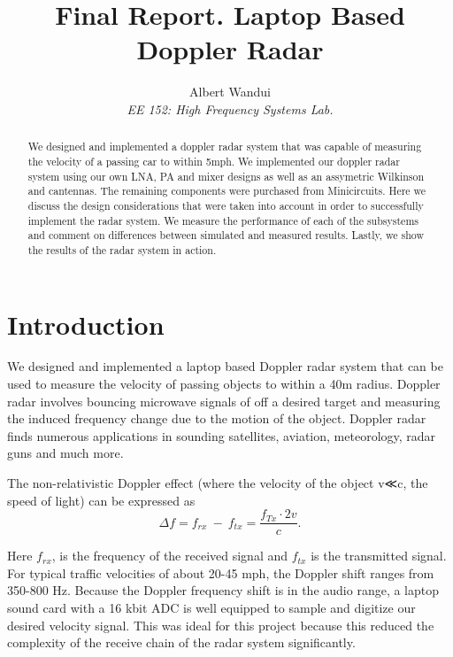 \documentclass[reprint, aps, prl]{revtex4-1}
\begin{document}
\title{Final Report. Laptop Based Doppler Radar }
\author{Albert Wandui \\
\textit{EE 152: High Frequency Systems Lab.}}

\begin{abstract}
We designed and implemented a doppler radar system that was capable of measuring the velocity of a passing car to within 5mph. We implemented our doppler radar system using our own LNA, PA and mixer designs as well as an assymetric Wilkinson and cantennas. The remaining components were purchased from Minicircuits. Here we discuss the design considerations that were taken into account in order to successfully implement the radar system. We measure the performance of each of the subsystems and comment on differences between simulated and measured results. Lastly, we show the results of the radar system in action.
\end{abstract}

\maketitle





\section*{Introduction}\label{sec:introduction}

We designed and implemented a laptop based Doppler radar system that can be used to measure the velocity of passing objects to within a 40m radius. Doppler radar involves bouncing microwave signals of off a desired target and measuring the induced frequency change due to the motion of the object. Doppler radar finds numerous applications in sounding satellites, aviation, meteorology, radar guns and much more.

The non-relativistic Doppler effect (where the velocity of the object v≪c, the speed of light) can be expressed as 
\begin{equation}
\Delta f= f_{rx}\ -\ f_{tx} = \frac{f_{Tx} \cdot 2 v}{c}.
\end{equation}

Here $f_{rx}$, is the frequency of the received signal and $f_{tx}$ is the transmitted signal. For typical traffic velocities of about 20-45 mph, the Doppler shift ranges from 350-800 Hz. Because the Doppler frequency shift is in the audio range, a laptop sound card with a 16 kbit ADC is well equipped to sample and digitize our desired velocity signal. This was ideal for this project because this reduced the complexity of the receive chain of the radar system significantly.
\end{document}
